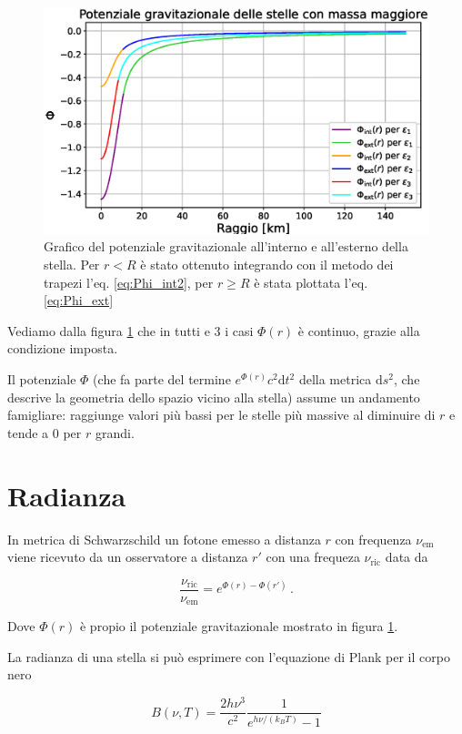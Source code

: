\documentclass[a4paper, titlepage]{article}
\newcommand{\Sh}[0]{Schwarzschild }
\begin{document}
\begin{figure}[h!]
    \centering
    \includegraphics[width = 0.8 \textwidth]{Figures/Phi.eps}
    \caption{Grafico del potenziale gravitazionale all'interno e all'esterno
    della stella.
    Per $r < R$ è stato ottenuto integrando con il metodo dei trapezi l'eq.
    \ref{eq:Phi_int2}, per $r \geq R$ è stata plottata l'eq. \ref{eq:Phi_ext}}
    \label{fig:Phi}
\end{figure}

Vediamo dalla figura \ref{fig:Phi} che in tutti e 3 i casi $\Phi (r)$ è
continuo, grazie alla condizione imposta.

Il potenziale $\Phi$ (che fa parte del termine $e^{\Phi (r)} c^2 \mathrm{d}t^2$
della metrica $\mathrm{d}s^2$, che descrive la geometria dello spazio vicino
alla stella) assume un andamento famigliare: raggiunge valori più bassi per le
stelle più massive al diminuire di $r$ e tende a 0 per $r$ grandi.


\section{Radianza} \label{sec:rad}

In metrica di \Sh un fotone emesso a distanza $r$ con frequenza $\nu_\text{em}$
viene ricevuto da un osservatore a distanza $r'$ con una frequeza
$\nu_\text{ric}$ data da

\begin{equation}
    \frac{\nu_\text{ric}}{\nu_\text{em}} = e^{\Phi (r) - \Phi (r')} \, .
\label{eq:redshift}
\end{equation}

Dove $\Phi (r)$ è propio il potenziale gravitazionale mostrato in figura
\ref{fig:Phi}.

La radianza di una stella si può esprimere con l'equazione di Plank per il corpo
nero

\begin{equation}
    B(\nu, T) = \frac{2 h \nu ^3}{c^2} \frac{1}{e^{h \nu / (k_B T)} - 1}
    \label{eq:rad}
\end{equation}
\end{document}
